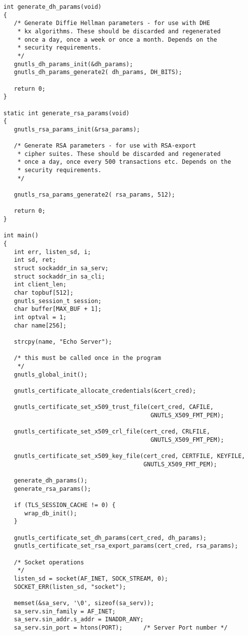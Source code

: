 \begin{verbatim}
int generate_dh_params(void)
{
   /* Generate Diffie Hellman parameters - for use with DHE
    * kx algorithms. These should be discarded and regenerated
    * once a day, once a week or once a month. Depends on the
    * security requirements.
    */
   gnutls_dh_params_init(&dh_params);
   gnutls_dh_params_generate2( dh_params, DH_BITS);

   return 0;
}

static int generate_rsa_params(void)
{
   gnutls_rsa_params_init(&rsa_params);

   /* Generate RSA parameters - for use with RSA-export
    * cipher suites. These should be discarded and regenerated
    * once a day, once every 500 transactions etc. Depends on the
    * security requirements.
    */

   gnutls_rsa_params_generate2( rsa_params, 512);

   return 0;
}

int main()
{
   int err, listen_sd, i;
   int sd, ret;
   struct sockaddr_in sa_serv;
   struct sockaddr_in sa_cli;
   int client_len;
   char topbuf[512];
   gnutls_session_t session;
   char buffer[MAX_BUF + 1];
   int optval = 1;
   char name[256];

   strcpy(name, "Echo Server");

   /* this must be called once in the program
    */
   gnutls_global_init();

   gnutls_certificate_allocate_credentials(&cert_cred);

   gnutls_certificate_set_x509_trust_file(cert_cred, CAFILE,
                                          GNUTLS_X509_FMT_PEM);

   gnutls_certificate_set_x509_crl_file(cert_cred, CRLFILE,
                                          GNUTLS_X509_FMT_PEM);

   gnutls_certificate_set_x509_key_file(cert_cred, CERTFILE, KEYFILE,
                                        GNUTLS_X509_FMT_PEM);

   generate_dh_params();
   generate_rsa_params();

   if (TLS_SESSION_CACHE != 0) {
      wrap_db_init();
   }

   gnutls_certificate_set_dh_params(cert_cred, dh_params);
   gnutls_certificate_set_rsa_export_params(cert_cred, rsa_params);

   /* Socket operations
    */
   listen_sd = socket(AF_INET, SOCK_STREAM, 0);
   SOCKET_ERR(listen_sd, "socket");

   memset(&sa_serv, '\0', sizeof(sa_serv));
   sa_serv.sin_family = AF_INET;
   sa_serv.sin_addr.s_addr = INADDR_ANY;
   sa_serv.sin_port = htons(PORT);      /* Server Port number */


\end{verbatim}
